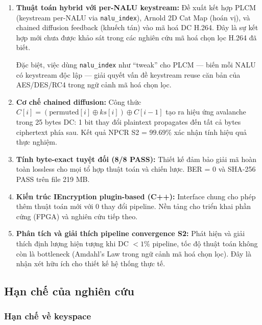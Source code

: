 \begin{enumerate}
  \item \textbf{Thuật toán hybrid với per-NALU keystream:}
        Đề xuất kết hợp PLCM (keystream per-NALU via \texttt{nalu\_index}),
        Arnold 2D Cat Map (hoán vị), và chained diffusion feedback (khuếch tán)
        vào mã hoá DC H.264. Đây là sự kết hợp mới chưa được khảo sát trong
        các nghiên cứu mã hoá chọn lọc H.264 đã biết.

        Đặc biệt, việc dùng \texttt{nalu\_index} như ``tweak'' cho PLCM
        --- biến mỗi NALU có keystream độc lập --- giải quyết vấn đề keystream
        reuse căn bản của AES/DES/RC4 trong ngữ cảnh mã hoá chọn lọc.

  \item \textbf{Cơ chế chained diffusion:}
        Công thức $C[i] = (\text{permuted}[i] \oplus ks[i]) \oplus C[i-1]$
        tạo ra hiệu ứng avalanche trong 25 bytes DC: 1 bit thay đổi plaintext
        propagates đến tất cả bytes ciphertext phía sau. Kết quả NPCR S2 = $99.69\%$
        xác nhận tính hiệu quả thực nghiệm.

  \item \textbf{Tính byte-exact tuyệt đối (8/8 PASS):}
        Thiết kế đảm bảo giải mã hoàn toàn lossless cho mọi tổ hợp thuật toán
        và chiến lược. BER = 0 và SHA-256 PASS trên file 219 MB.

  \item \textbf{Kiến trúc IEncryption plugin-based (C++):}
        Interface chung cho phép thêm thuật toán mới với 0 thay đổi pipeline.
        Nền tảng cho triển khai phần cứng (FPGA) và nghiên cứu tiếp theo.

  \item \textbf{Phân tích và giải thích pipeline convergence S2:}
        Phát hiện và giải thích định lượng hiện tượng khi DC $< 1\%$ pipeline,
        tốc độ thuật toán không còn là bottleneck (Amdahl's Law trong ngữ cảnh
        mã hoá chọn lọc). Đây là nhận xét hữu ích cho thiết kế hệ thống thực tế.
\end{enumerate}

\subsection{Hạn chế của nghiên cứu}

\subsubsection{Hạn chế về keyspace}

